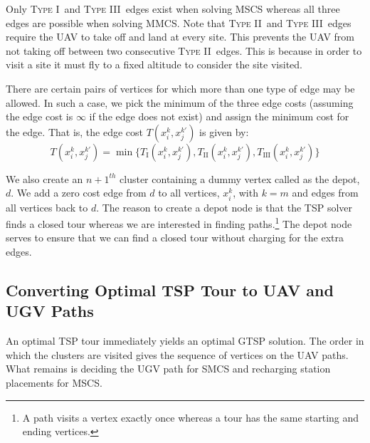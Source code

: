 \documentclass[letterpaper,10pt,conference]{ieeeconf}
\newcommand{\typeone}{\textsc{Type I\ }}
\newcommand{\typetwo}{\textsc{Type II\ }}
\newcommand{\typethree}{\textsc{Type III\ }}
\begin{document}
Only \typeone and \typethree edges exist when solving MSCS whereas all three edges are possible when solving MMCS. %
Note that \typetwo and \typethree edges require the UAV to take off and land at every site. This prevents the UAV from not taking off between two consecutive \typetwo edges. This is because in order to visit a site it must fly to a fixed altitude to consider the site visited.

There are certain pairs of vertices for which more than one type of edge may be allowed. In such a case, we pick the minimum of the three edge costs (assuming the edge cost is $\infty$ if the edge does not exist) and assign the minimum cost for the edge. That is, the edge cost $T(x_i^k,x_j^{k'})$ is given by:
\begin{equation*}
T(x_i^k,x_j^{k'}) = \min \{T_\text{I}(x_i^k,x_j^{k'}),T_\text{II}(x_i^k,x_j^{k'}),T_\text{III}(x_i^k,x_j^{k'})\}
\end{equation*}

We also create an $n+1^{th}$ cluster containing a dummy vertex called as the depot, $d$. We add a zero cost edge from $d$ to all vertices, $x_i^k$, with $k = m$ and edges from all vertices back to $d$. The reason to create a depot node is that the TSP solver finds a closed tour whereas we are interested in finding paths.\footnote{A path visits a vertex exactly once whereas a tour has the same starting and ending vertices.} The depot node serves to ensure that we can find a closed tour without charging for the extra edges.


\subsection{Converting Optimal TSP Tour to UAV and UGV Paths}
An optimal TSP tour immediately yields an optimal GTSP solution.
The order in which the clusters are visited gives the sequence of vertices on the UAV paths. What remains is deciding the UGV path for SMCS and recharging station placements for MSCS. 
\end{document}
